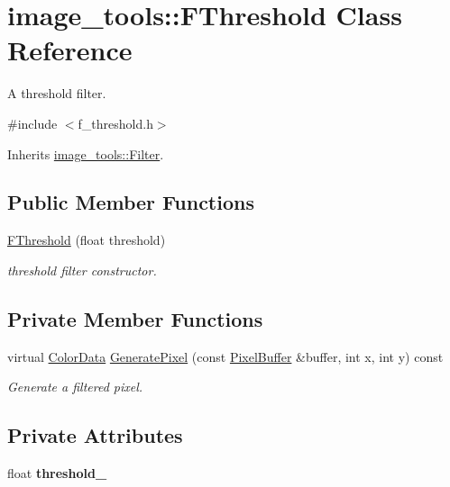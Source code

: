 \hypertarget{classimage__tools_1_1FThreshold}{}\section{image\+\_\+tools\+:\+:F\+Threshold Class Reference}
\label{classimage__tools_1_1FThreshold}


A threshold filter.  




{\ttfamily \#include $<$f\+\_\+threshold.\+h$>$}



Inherits \hyperlink{classimage__tools_1_1Filter}{image\+\_\+tools\+::\+Filter}.

\subsection*{Public Member Functions}
\begin{DoxyCompactItemize}
\item 
\hyperlink{classimage__tools_1_1FThreshold_a999a5dfc3f95d147b4030789ebb77931}{F\+Threshold} (float threshold)
\begin{DoxyCompactList}\small\item\em threshold filter constructor. \end{DoxyCompactList}\end{DoxyCompactItemize}
\subsection*{Private Member Functions}
\begin{DoxyCompactItemize}
\item 
virtual \hyperlink{classimage__tools_1_1ColorData}{Color\+Data} \hyperlink{classimage__tools_1_1FThreshold_a39d2402969ac038c7ab132f68a754637}{Generate\+Pixel} (const \hyperlink{classimage__tools_1_1PixelBuffer}{Pixel\+Buffer} \&buffer, int x, int y) const 
\begin{DoxyCompactList}\small\item\em Generate a filtered pixel. \end{DoxyCompactList}\end{DoxyCompactItemize}
\subsection*{Private Attributes}
\begin{DoxyCompactItemize}
\item 
float {\bfseries threshold\+\_\+}\hypertarget{classimage__tools_1_1FThreshold_aa6cad820a5bfbdc61f38e34aca51018e}{}\label{classimage__tools_1_1FThreshold_aa6cad820a5bfbdc61f38e34aca51018e}

\end{DoxyCompactItemize}


